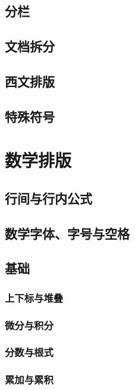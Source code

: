 {\section{分栏}

\section{文档拆分}
\label{sec:include}

\section{西文排版}

\section{特殊符号}

\chapter{数学排版}
\section{行间与行内公式}

\section{数学字体、字号与空格}
\label{sec:mathfont}

\section{基础}
\subsection{上下标与堆叠}

\subsection{微分与积分}

\subsection{分数与根式}

\subsection{累加与累积}

}
